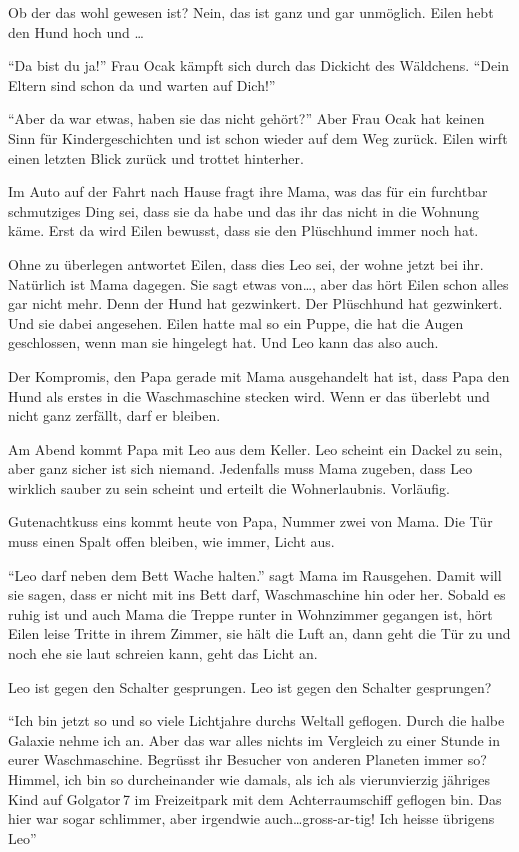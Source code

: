 Ob der das wohl gewesen ist? Nein, das ist ganz und gar unmöglich. Eilen hebt den Hund hoch und \dots

\enquote{Da bist du ja!} Frau Ocak kämpft sich durch das Dickicht des Wäldchens. \enquote{Dein Eltern sind schon da und warten auf Dich!}

\enquote{Aber da war etwas, haben sie das nicht gehört?} Aber Frau Ocak hat keinen Sinn für Kindergeschichten und ist schon wieder auf dem Weg zurück. Eilen wirft einen letzten Blick zurück und trottet hinterher.

Im Auto auf der Fahrt nach Hause fragt ihre Mama, was das für ein furchtbar schmutziges Ding sei, dass sie da habe und das ihr das nicht in die Wohnung käme. Erst da wird Eilen bewusst, dass sie den Plüschhund immer noch hat. 

Ohne zu überlegen antwortet Eilen, dass dies Leo sei, der wohne jetzt bei ihr. Natürlich ist Mama dagegen. Sie sagt etwas von\dots, aber das hört Eilen schon alles gar nicht mehr. Denn der Hund hat gezwinkert. Der Plüschhund hat gezwinkert. Und sie dabei angesehen. Eilen hatte mal so ein Puppe, die hat die Augen geschlossen, wenn man sie hingelegt hat. Und Leo kann das also auch.

Der Kompromis, den Papa gerade mit Mama ausgehandelt hat ist, dass Papa den Hund als erstes in die Waschmaschine stecken wird. Wenn er das überlebt und nicht ganz zerfällt, darf er bleiben.

Am Abend kommt Papa mit Leo aus dem Keller. Leo scheint ein Dackel zu sein, aber ganz sicher ist sich niemand. Jedenfalls muss Mama zugeben, dass Leo wirklich sauber zu sein scheint und erteilt die Wohnerlaubnis. Vorläufig.

Gutenachtkuss eins kommt heute von Papa, Nummer zwei von Mama. Die Tür muss einen Spalt offen bleiben, wie immer, Licht aus.

\enquote{Leo darf neben dem Bett Wache halten.} sagt Mama im Rausgehen. Damit will sie sagen, dass er nicht mit ins Bett darf, Waschmaschine hin oder her. Sobald es ruhig ist und auch Mama die Treppe runter in Wohnzimmer gegangen ist, hört Eilen leise Tritte in ihrem Zimmer, sie hält die Luft an, dann geht die Tür zu und noch ehe sie laut schreien kann, geht das Licht an. 

Leo ist gegen den Schalter gesprungen. Leo ist gegen den Schalter gesprungen? 

\enquote{Ich bin jetzt so und so viele Lichtjahre durchs Weltall geflogen. Durch die halbe Galaxie nehme ich an. Aber das war alles nichts im Vergleich zu einer Stunde in eurer Waschmaschine. Begrüsst ihr Besucher von anderen Planeten immer so? Himmel, ich bin so durcheinander wie damals, als ich als vierunvierzig jähriges Kind auf Golgator\,7 im Freizeitpark mit dem Achterraumschiff geflogen bin. Das hier war sogar schlimmer, aber irgendwie auch\dots gross-ar-tig! Ich heisse übrigens Leo}

